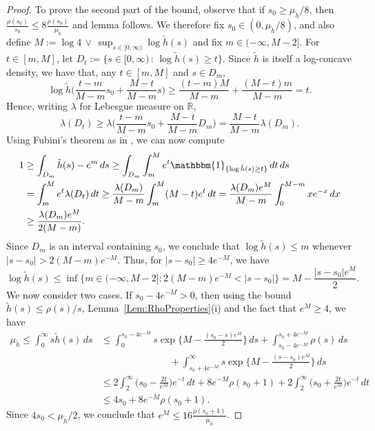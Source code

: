 \documentclass[a4paper,12pt]{article}
\begin{document}
\begin{proof}
  To prove the second part of the bound, observe that if $s_0 \geq \mu_{\tilde{h}}/8$, then $\frac{\rho(s_0)}{s_0} \leq 8 \frac{\rho(s_0)}{\mu_{\tilde{h}}}$ and lemma follows.  We therefore fix $s_0 \in (0, \mu_{\tilde{h}}/8)$, and also define $M := \log 4 \, \vee \, \sup_{s \in [0, \infty)} \log \tilde{h}(s)$ and fix $m \in (-\infty, M-2]$.  For $t \in [m,M]$, let $D_t := \{s \in [0,\infty) \,:\, \log \tilde{h}(s) \geq t\}$.  Since $\tilde{h}$ is itself a log-concave density, we have that, any $t \in [m,M]$ and $s \in D_m$, 
\[
\log \tilde{h} \biggl(\frac{t-m}{M-m}s_0 + \frac{M-t}{M-m}s\biggr) \geq \frac{(t-m)M}{M-m} + \frac{(M-t)m}{M-m} = t.
\]
Hence, writing $\lambda$ for Lebesgue measure on $\mathbb{R}$,
\[
\lambda(D_t) \geq \lambda \biggl(\frac{t-m}{M-m}s_0 + \frac{M-t}{M-m}D_m\biggr) = \frac{M-t}{M-m}\lambda(D_m).
\]
Using Fubini's theorem as in \citet[][Lemma~4.1]{dumbgen2011approximation}, we can now compute
\begin{align*}
1 &\geq \int_{D_m} \tilde{h}(s) - e^m \, ds \geq \int_{D_m} \int_m^M e^t \mathbbm{1}_{\{\log \tilde{h}(s) \geq t\}} \, dt \, ds \\
&= \int_m^M e^t \lambda(D_t) \, dt \geq \frac{\lambda(D_m)}{M-m}\int_m^M (M-t)e^t \, dt = \frac{\lambda(D_m)e^M}{M-m}\int_0^{M-m} xe^{-x} \, dx \\
&\geq \frac{\lambda(D_m)e^M}{2(M-m)}.
\end{align*}                
Since $D_m$ is an interval containing $s_0$, we conclude that $\log \tilde{h}(s) \leq m$ whenever $|s-s_0| > 2(M-m)e^{-M}$.  Thus, for $|s-s_0| \geq 4e^{-M}$, we have
\[
\log \tilde{h}(s) \leq \inf\bigl\{m \in (-\infty,M-2] :2(M-m)e^{-M} < |s-s_0|\bigr\} = M - \frac{|s-s_0|e^M}{2}.
\]
We now consider two cases.  If $s_0 - 4e^{-M} > 0$, then using the bound $\tilde{h}(s) \leq \rho(s)/s$, Lemma~\ref{Lem:RhoProperties}(i) and the fact that $e^M \geq 4$, we have 
\begin{align*}
  \mu_{\tilde{h}} \leq \int_0^\infty s \tilde{h}(s) \, ds
  &\leq \int_0^{s_0 - 4e^{-M}} s \exp\biggl\{M - \frac{(s_0-s)e^M}{2}\biggr\} \, ds + \int_{s_0 - 4e^{-M}}^{s_0 + 4e^{-M}} \rho(s) \, ds \\  
  &\hspace{3cm} + \int_{s_0 + 4e^{-M}}^\infty s \exp\biggl\{M - \frac{(s-s_0)e^M}{2}\biggr\} \, ds \\ %
  &\leq 2\int_2^\infty \biggl(s_0 - \frac{2t}{e^M}\biggr) e^{-t} \, dt + 8e^{-M} \rho(s_0 + 1) + 2\int_2^\infty \biggl(s_0 + \frac{2t}{e^M}\biggr) e^{-t} \, dt \\  %
  &\leq 4 s_0 + 8 e^{-M} \rho(s_0 + 1).
\end{align*}
Since $4s_0 < \mu_{\tilde{h}}/2$, we conclude that $e^M \leq 16 \frac{\rho(s_0 + 1)}{\mu_{\tilde{h}}}$. 


\end{proof}
\end{document}
